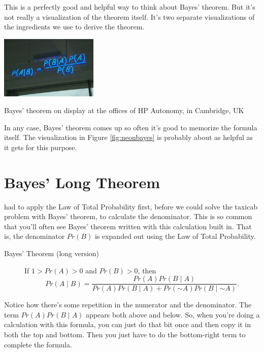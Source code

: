 \documentclass[justified]{tufte-book}
\newcommand{\given}{\mid}
\renewcommand{\neg}{\mathbin{\sim}}
\newcommand{\p}{Pr}
\theoremstyle{definition}
\theoremstyle{definition}
\theoremstyle{definition}
\theoremstyle{remark}
\begin{document}
This is a perfectly good and helpful way to think about Bayes' theorem.
But it's not really a visualization of the theorem itself. It's two
separate visualizations of the ingredients we use to derive the theorem.

\begin{marginfigure}
\includegraphics[width=1.83in]{img/neon_bayes} \caption[Bayes' theorem on display at the offices of HP Autonomy, in Cambridge, UK]{Bayes' theorem on display at the offices of HP Autonomy, in Cambridge, UK}\label{fig:neonbayes}
\end{marginfigure}

In any case, Bayes' theorem comes up so often it's good to memorize the
formula itself. The visualization in Figure \ref{fig:neonbayes} is
probably about as helpful as it gets for this purpose.

\hypertarget{bayes-long-theorem}{%
\section{Bayes' Long Theorem}\label{bayes-long-theorem}}

 had to apply the Law of Total Probability first, before
we could solve the taxicab problem with Bayes' theorem, to calculate the
denominator. This is so common that you'll often see Bayes' theorem
written with this calculation built in. That is, the denominator
\(\p(B)\) is expanded out using the Law of Total Probability.

\begin{description}
\item[Bayes' Theorem (long version)]
If \(1 > \p(A) > 0\) and \(\p(B)>0\), then
\[ \p(A \given B) = \frac{\p(A)\p(B \given A)}{\p(A)\p(B \given A) + \p(\neg A)\p(B \given \neg A)}. \]
\end{description}

Notice how there's some repetition in the numerator and the denominator.
The term \(\p(A)\p(B \given A)\) appears both above and below. So, when
you're doing a calculation with this formula, you can just do that bit
once and then copy it in both the top and bottom. Then you just have to
do the bottom-right term to complete the formula.
\end{document}
